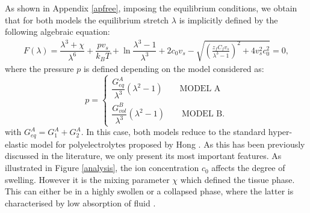 \documentclass[runningheads]{llncs}
\begin{document}
As shown in Appendix \ref{apfree}, imposing the equilibrium conditions, we obtain that for both models the equilibrium stretch $\lambda$ is implicitly defined by the following algebraic equation:
\begin{gather}
\textstyle 
F(\lambda)=\dfrac{\lambda^3+\chi}{\lambda^6}+\dfrac{p v_s}{k_BT}+\ln \dfrac{\lambda^3-1}{\lambda^3} +2c_0v_s-\sqrt{\left(\frac{z_fC_fv_s}{\lambda^3-1}\right)^2+4v_s^2c^2_0} =0, \label{eqF}
\end{gather}
where the pressure $p$ is defined depending on the model considered as:
\begin{equation}
p = \begin{cases}
\dfrac{G^A_{eq}}{\lambda^3}(\lambda^2-1)\qquad \text{MODEL A}\\[10pt]
\dfrac{G^B_{vol}}{\lambda^3}(\lambda^2-1)\qquad \text{MODEL B}.
\end{cases}
\end{equation}
with $G^A_{eq}=G^A_1+G^A_2$. In this case, both models reduce to the standard hyper-elastic model for polyelectrolytes proposed by Hong \cite{Reviewpolyel}. As this has been previously discussed in the literature, we only present its most important features. As illustrated in Figure \ref{analysis}, the ion concentration $c_0$ affects the degree of swelling. However it is the mixing parameter $\chi$ which defined the tissue phase. This can either be in a highly swollen or a collapsed phase, where the latter is characterised by low absorption of fluid \cite{swell2}.  
\end{document}
